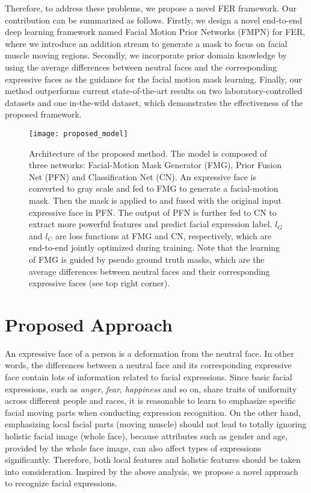 \documentclass[conference,a4paper]{IEEEtran}
\begin{document}
Therefore, to address these problems, we propose a novel FER framework. Our contribution can be summarized as follows. Firstly, we design a novel end-to-end deep learning framework
named Facial Motion Prior Networks (FMPN) for FER, where we introduce an addition stream to generate a mask to focus on facial muscle moving regions. Secondly, 
we incorporate prior domain knowledge by using the average differences between neutral faces and the corresponding expressive faces as the guidance for the facial motion mask learning.
Finally, our method outperforms current state-of-the-art results
on two laboratory-controlled datasets and one in-the-wild dataset, which demonstrates the effectiveness of the proposed framework.








\begin{figure*}[t!]
    \centering
    \texttt{[image: proposed\_model]}
    \caption{Architecture of the proposed method. The model is composed of three networks: Facial-Motion Mask Generator (FMG), Prior Fusion Net (PFN) and Classification Net (CN). An expressive face is converted to gray scale and fed to FMG to generate a facial-motion mask. Then the mask is applied to and fused with the original input expressive face in PFN. The output of PFN is further fed to CN to extract more powerful features and predict facial expression label. $l_G$ and $l_C$ are loss functions at FMG and CN, respectively, which are end-to-end jointly optimized during training. Note that the learning of FMG is guided by pseudo ground truth masks, which are the average differences between neutral faces and their corresponding expressive faces (see top right corner).} \label{fig:proposed_model}
\end{figure*}

\section{Proposed Approach}
An expressive face of a person is a deformation from the neutral face. In other words, the differences between a neutral face and its corresponding expressive face contain lots of information related to facial expressions. Since basic facial expressions, such as \textit{anger}, \textit{fear}, \textit{happiness} and so on, share traits of uniformity across different people and races, it is reasonable to learn to emphasize specific facial moving parts when conducting expression recognition. On the other hand, emphasizing local facial parts (moving muscle) should not lead to totally ignoring holistic facial image (whole face),  because attributes such as gender and age, provided by the whole face image, can also affect types of expressions significantly. Therefore, both local features and holistic features should be taken into consideration. Inspired by the above analysis, we propose a novel approach to recognize facial expressions.
\end{document}
